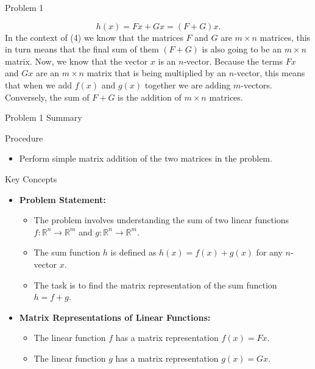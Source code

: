 \begin{problem}{Problem 1}
\begin{highlight}[Solution]
        \begin{equation}
            h(x) = Fx + Gx = (F + G)x.
        \end{equation}
        In the context of (4) we know that the matrices $F$ and $G$ are $m \times n$ matrices, this in turn means that the final sum of them $(F + G)$ is also going to be an $m \times n$ matrix. Now,
        we know that the vector $x$ is an $n$-vector. Because the terms $Fx$ and $Gx$ are an $m \times n$ matrix that is being multiplied by an $n$-vector, this means that when we add $f(x)$ and $g(x)$
        together we are adding $m$-vectors. Conversely, the sum of $F + G$ is the addition of $m \times n$ matrices.
    \end{highlight}
\end{problem}

\begin{summary}{Problem 1 Summary}
    \begin{statement}{Procedure}
        \begin{itemize}
            \item Perform simple matrix addition of the two matrices in the problem.
        \end{itemize}
    \end{statement}
    \begin{statement}{Key Concepts}
        \begin{itemize}
            \item \textbf{Problem Statement:}
            \begin{itemize}
                \item The problem involves understanding the sum of two linear functions $f: \mathbb{R}^n \to \mathbb{R}^m$ and $g: \mathbb{R}^n \to \mathbb{R}^m$.
                \item The sum function $h$ is defined as $h(x) = f(x) + g(x)$ for any $n$-vector $x$.
                \item The task is to find the matrix representation of the sum function $h = f + g$.
            \end{itemize}
            \item \textbf{Matrix Representations of Linear Functions:}
            \begin{itemize}
                \item The linear function $f$ has a matrix representation $f(x) = Fx$.
                \item The linear function $g$ has a matrix representation $g(x) = Gx$.

\end{itemize}
\end{itemize}
\end{statement}
\end{summary}
